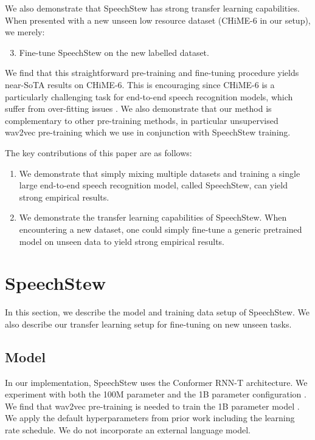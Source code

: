\documentclass[a4paper]{article}
\begin{document}
We also demonstrate that SpeechStew has strong transfer learning capabilities. When presented with a new unseen low resource dataset (CHiME-6 in our setup), we merely:

\begin{enumerate}[noitemsep]
    \setcounter{enumi}{2}
    \item Fine-tune SpeechStew on the new labelled dataset.
\end{enumerate}

We find that this straightforward pre-training and fine-tuning procedure yields near-SoTA results on CHiME-6. This is encouraging since CHiME-6 is a particularly challenging task \cite{watanabe-arxiv-2020} for end-to-end speech recognition models, which suffer from over-fitting issues \cite{andrusenko-arxiv-2020}. We also demonstrate that our method is complementary to other pre-training methods, in particular unsupervised wav2vec pre-training \cite{schneider-arxiv-2019} which we use in conjunction with SpeechStew training.

The key contributions of this paper are as follows:
\begin{enumerate}[noitemsep]
    \item We demonstrate that simply mixing multiple datasets and training a single large end-to-end speech recognition model, called SpeechStew, can yield strong empirical results.
    \item We demonstrate the transfer learning capabilities of SpeechStew. When encountering a new dataset, one could simply fine-tune a generic pretrained model on unseen data to yield strong empirical results.
\end{enumerate}

\section{SpeechStew}


In this section, we describe the model and training data setup of SpeechStew. We also describe our transfer learning setup for fine-tuning on new unseen tasks. 



\subsection{Model}
In our implementation, SpeechStew uses the Conformer \cite{gulati-interspeech-2020} RNN-T \cite{graves-icml-2012} architecture. We experiment with both the 100M parameter \cite{gulati-interspeech-2020} and the 1B parameter configuration \cite{zhang-arxiv-2020}. We find that wav2vec pre-training \cite{baevski-arxiv-2020} is needed to train the 1B parameter model \cite{zhang-arxiv-2020}. We apply the default hyperparameters from prior work \cite{gulati-interspeech-2020,zhang-arxiv-2020} including the learning rate schedule. We do not incorporate an external language model.
\end{document}
